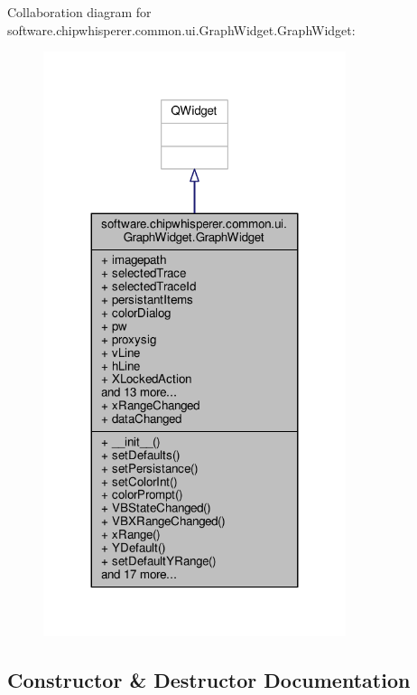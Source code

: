 Collaboration diagram for software.\+chipwhisperer.\+common.\+ui.\+Graph\+Widget.\+Graph\+Widget\+:\nopagebreak
\begin{figure}[H]
\begin{center}
\leavevmode
\includegraphics[width=251pt]{d0/d2f/classsoftware_1_1chipwhisperer_1_1common_1_1ui_1_1GraphWidget_1_1GraphWidget__coll__graph}
\end{center}
\end{figure}


\subsection{Constructor \& Destructor Documentation}
\hypertarget{classsoftware_1_1chipwhisperer_1_1common_1_1ui_1_1GraphWidget_1_1GraphWidget_a99051eb11b85b8acb92d52aa16848922}{}
